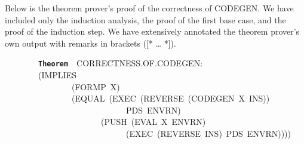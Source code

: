 \documentclass[11pt]{book}
\newenvironment{pubasis}{\begin{flushleft}\ttfamily\small}{\normalsize\rmfamily\end{flushleft}}
\newcommand{\axiomordefinition}[1]{\vspace{6pt}\texttt{\textbf{#1}}}
\begin{document}
Below is the theorem prover's proof of the correctness of CODEGEN.
We have  included only the induction analysis, the proof of the first
base case, and the proof of the induction step.  We have extensively
annotated the theorem prover's own output with remarks in brackets ([* \ldots{} *]).
\begin{pubasis}
~~~~~~~~\axiomordefinition{Theorem}~~CORRECT\-NESS.OF.CODEGEN:\\
~~~~~~~~(IMPLIES\\
~~~~~~~~~~~~~~~~(FORMP~X)\\
~~~~~~~~~~~~~~~~(EQUAL~(EXEC~(REVERSE~(CODEGEN~X~INS))\\
~~~~~~~~~~~~~~~~~~~~~~~~~~~~~PDS~ENVRN)\\
~~~~~~~~~~~~~~~~~~~~~~~(PUSH~(EVAL~X~ENVRN)\\
~~~~~~~~~~~~~~~~~~~~~~~~~~~~~(EXEC~(REVERSE~INS)~PDS~ENVRN))))\\
\end{pubasis}
\end{document}
